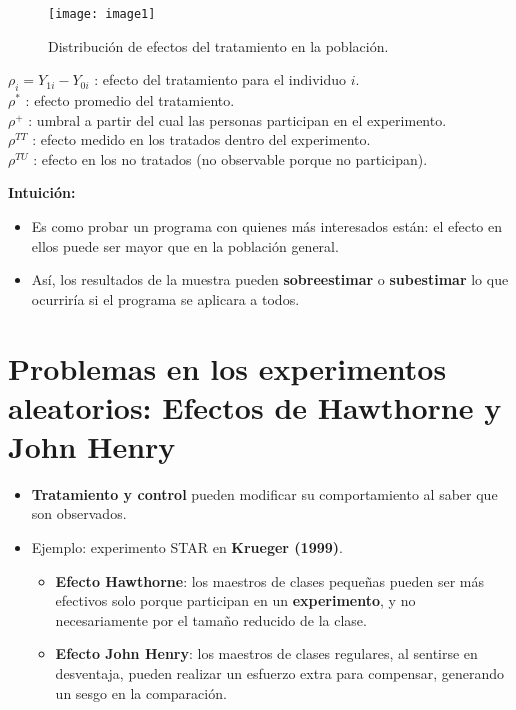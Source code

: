 \documentclass[12pt]{article}
\begin{document}
\begin{figure}[h!]
\centering
\texttt{[image: image1]}
\caption{\footnotesize Distribución de efectos del tratamiento en la población.}
\end{figure}

\begin{flushleft}
\footnotesize
$\rho_i = Y_{1i} - Y_{0i}$ : efecto del tratamiento para el individuo $i$. \\
$\rho^*$ : efecto promedio del tratamiento. \\
$\rho^+$ : umbral a partir del cual las personas participan en el experimento. \\
$\rho^{TT}$ : efecto medido en los tratados dentro del experimento. \\
$\rho^{TU}$ : efecto en los no tratados (no observable porque no participan). \\
\normalsize
\end{flushleft}

\textbf{Intuición:}
\begin{itemize}
    \item Es como probar un programa con quienes más interesados están: el efecto en ellos puede ser mayor que en la población general.
    \item Así, los resultados de la muestra pueden \textbf{sobreestimar} o \textbf{subestimar} lo que ocurriría si el programa se aplicara a todos.
\end{itemize}

\section*{\noindent\textbf{Problemas en los experimentos aleatorios: Efectos de Hawthorne y John Henry}}

\begin{itemize}
    \item \textbf{Tratamiento y control} pueden modificar su comportamiento al saber que son observados.
    \item Ejemplo: experimento STAR en \textbf{Krueger (1999)}.
    \begin{itemize}
        \item \textbf{Efecto Hawthorne}: los maestros de clases pequeñas pueden ser más efectivos solo porque participan en un \textbf{experimento}, y no necesariamente por el tamaño reducido de la clase.
        \item \textbf{Efecto John Henry}: los maestros de clases regulares, al sentirse en desventaja, pueden realizar un esfuerzo extra para compensar, generando un sesgo en la comparación.
    \end{itemize}
\end{itemize}
\end{document}
